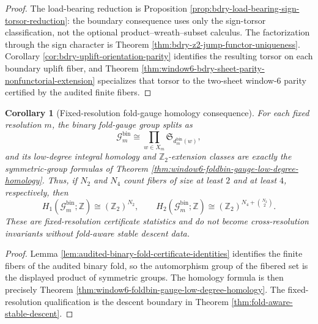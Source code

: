 \documentclass[12pt,a4paper]{article}
\theoremstyle{plain}
\newtheorem{corollary}[theorem]{Corollary}
\theoremstyle{definition}
\numberwithin{equation}{section}
\newcommand{\ZZ}{\mathbb{Z}}
\begin{document}
\begin{proof}
The load-bearing reduction is Proposition \ref{prop:bdry-load-bearing-sign-torsor-reduction}: the boundary consequence uses only the sign-torsor classification, not the optional product--wreath--subset calculus.  The factorization through the sign character is Theorem \ref{thm:bdry-z2-jump-functor-uniqueness}.  Corollary \ref{cor:bdry-uplift-orientation-parity} identifies the resulting torsor on each boundary uplift fiber, and Theorem \ref{thm:window6-bdry-sheet-parity-nonfunctorial-extension} specializes that torsor to the two-sheet window-\(6\) parity certified by the audited finite fibers. \qedhere
\end{proof}

\begin{corollary}[Fixed-resolution fold-gauge homology consequence]\label{cor:main-fold6-gauge-homology-consequence}
For each fixed resolution \(m\), the binary fold-gauge group splits as
\[
\mathcal G_m^{\mathrm{bin}}\cong\prod_{w\in X_m}\mathfrak S_{d_m^{\mathrm{bin}}(w)},
\]
and its low-degree integral homology and \(\ZZ_2\)-extension classes are exactly the symmetric-group formulas of Theorem \ref{thm:window6-foldbin-gauge-low-degree-homology}.  Thus, if \(N_2\) and \(N_4\) count fibers of size at least \(2\) and at least \(4\), respectively, then
\[
H_1(\mathcal G_m^{\mathrm{bin}};\ZZ)\cong(\ZZ_2)^{N_2},
\qquad
H_2(\mathcal G_m^{\mathrm{bin}};\ZZ)\cong(\ZZ_2)^{N_4+\binom{N_2}{2}}.
\]
These are fixed-resolution certificate statistics and do not become cross-resolution invariants without fold-aware stable descent data.
\end{corollary}

\begin{proof}
Lemma \ref{lem:audited-binary-fold-certificate-identities} identifies the finite fibers of the audited binary fold, so the automorphism group of the fibered set is the displayed product of symmetric groups.  The homology formula is then precisely Theorem \ref{thm:window6-foldbin-gauge-low-degree-homology}.  The fixed-resolution qualification is the descent boundary in Theorem \ref{thm:fold-aware-stable-descent}. \qedhere
\end{proof}
\end{document}
